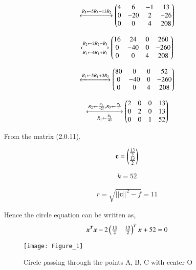 \documentclass[journal,12pt,twocolumn]{IEEEtran}
\begin{document}
\begin{align}
\xleftrightarrow[]{R_3\leftarrow5R_3-13R_2}\begin{pmatrix}4&6&-1&13\\0&-20&2&-26\\0&0&4&208\end{pmatrix}
\end{align}

\begin{align}
\xleftrightarrow[R_1\leftarrow4R_1 + R_3]{R_2\leftarrow2R_2-R_3}\begin{pmatrix}16&24&0&260\\0&-40&0&-260\\0&0&4&208\end{pmatrix}
\end{align}

\begin{align}
\xleftrightarrow[]{R_1\leftarrow5R_1+3R_2}\begin{pmatrix}80&0&0&52\\0&-40&0&-260\\0&0&4&208\end{pmatrix}
\end{align}

\begin{align}
\xleftrightarrow[R_1\leftarrow\frac{R_1}{40}]{R_2\leftarrow\frac{R_2}{-20}, R_3\leftarrow\frac{R_1}{4}}\begin{pmatrix}2&0&0&13\\0&2&0&13\\0&0&1&52\end{pmatrix}
\end{align}

From the matrix (2.0.11), 

\begin{align}
    \textbf{c} = \begin{pmatrix}\frac{13}{2}\\\frac{13}{2}\end{pmatrix}
\end{align}

\begin{align}
    k = 52
\end{align}

\begin{align}
    r = \sqrt{{||\textbf{c}||}^2-f}=11
\end{align}

Hence the circle equation can be written as,
\begin{align}
    \boldsymbol{{x^{T}}x}-2\begin{pmatrix}\frac{13}{2}&\frac{13}{2}\end{pmatrix}^T\boldsymbol{x} + 52 = 0
\end{align}
 
\begin{figure}[!]
\centering
\texttt{[image: Figure\_1]}
\caption{Circle passing through the points A, B, C with center O}
\end{figure}
\end{document}
